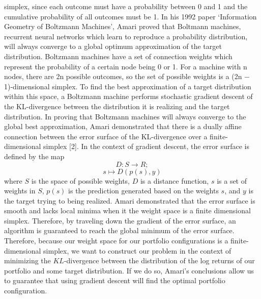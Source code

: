 \documentclass{article}
\begin{document}
simplex, since each outcome must have a probability between 0 and 1 and the cumulative probability of all outcomes must be 1.
In his 1992 paper ‘Information Geometry of Boltzmann Machines’, Amari proved that Boltmann machines, recurrent neural networks which learn to reproduce a probability distribution, will always converge to a global optimum approximation of the target distribution. Boltzmann machines have a set of connection weights which represent the probability of a certain node being 0 or 1. For a machine with n nodes, there are 2n possible outcomes, so the set of possible weights is a (2n − 1)-dimensional simplex. To find the best approximation of a target distribution within this space, a Boltzmann machine performs stochastic gradient descent of the KL-divergence between the distribution it is realizing and the target distribution. In proving that Boltzmann machines will always converge to the global best approximation, Amari demonstrated that there is a dually affine connection between the error surface of the KL-divergence over a finite-dimensional simplex [2].
In the context of gradient descent, the error surface is defined by the map
\[D : S \rightarrow R;\]
\[s  \mapsto D(p(s), y)\]
where $S$ is the space of possible weights, $D$ is a distance function, $s$ is a set of weights in $S$, $p(s)$ is the prediction generated based on the weights $s$, and $y$ is the target trying to being realized. Amari demonstrated that the error surface is smooth and lacks local minima when it the weight space is a finite dimensional simplex. Therefore, by traveling down the gradient of the error surface, an algorithm is guaranteed to reach the global minimum of the error surface.
Therefore, because our weight space for our portfolio configurations is a finite-dimensional simplex, we want to construct our problem in the context of minimizing the $KL$-divergence between the distribution of the log returns of our portfolio and some target distribution. If we do so, Amari’s conclusions allow us to guarantee that using gradient descent will find the optimal portfolio configuration.
\end{document}
